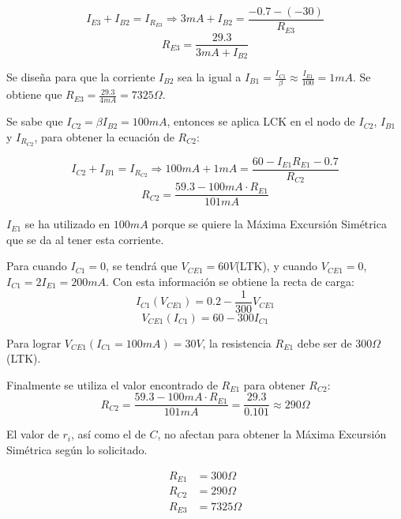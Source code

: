 \begin{equation*}
  I_{E3} + I_{B2} = I_{R_{E3}} \Rightarrow 3mA + I_{B2} = \frac{-0.7 - (-30)}{R_{E3}}
\end{equation*}
\begin{equation*}
  R_{E3} = \frac{29.3}{3mA + I_{B2}}
\end{equation*}

Se diseña para que la corriente $I_{B2}$ sea la igual a
$I_{B1} = \frac{I_{C1}}{\beta} \approx \frac{I_{E1}}{100} = 1mA$. Se
obtiene que $R_{E3} = \frac{29.3}{4mA} = 7325\Omega$.

Se sabe que $I_{C2} = \beta I_{B2} = 100mA$, entonces se aplica LCK en el nodo
de $I_{C2}$, $I_{B1}$ y $I_{R_{C2}}$, para obtener la ecuación de $R_{C2}$:

\begin{equation*}
  I_{C2} + I_{B1} = I_{R_{C2}} \Rightarrow 100mA + 1mA = \frac{60 - I_{E1} R_{E1} - 0.7}{R_{C2}}
\end{equation*}
\begin{equation*}
  R_{C2} = \frac{59.3 - 100mA \cdot R_{E1}}{101mA}
\end{equation*}

$I_{E1}$ se ha utilizado en $100mA$ porque se quiere la Máxima Excursión
Simétrica que se da al tener esta corriente.

Para cuando $I_{C1} = 0$, se tendrá que
$V_{CE1} = 60V$(LTK), y cuando $V_{CE1} = 0$, $I_{C1} = 2 I_{E1} = 200mA$. Con
esta información se obtiene la recta de carga:
\begin{equation*}
  I_{C1}(V_{CE1}) = 0.2 - \frac{1}{300} V_{CE1}
\end{equation*}
\begin{equation*}
  V_{CE1}(I_{C1}) = 60 - 300 I_{C1}
\end{equation*}

Para lograr $V_{CE1}(I_{C1} = 100mA) = 30V$, la resistencia $R_{E1}$ debe ser de
$300\Omega$(LTK).

Finalmente se utiliza el valor encontrado de $R_{E1}$ para obtener $R_{C2}$:
\begin{equation*}
  R_{C2} = \frac{59.3 - 100mA \cdot R_{E1}}{101mA} = \frac{29.3}{0.101} \approx 290\Omega
\end{equation*}

El valor de $r_i$, así como el de $C$, no afectan para obtener la Máxima
Excursión Simétrica según lo solicitado.


\begin{align*}
  R_{E1} &= 300 \Omega \\
  R_{C2} &= 290 \Omega \\
  R_{E3} &= 7325 \Omega
\end{align*}
